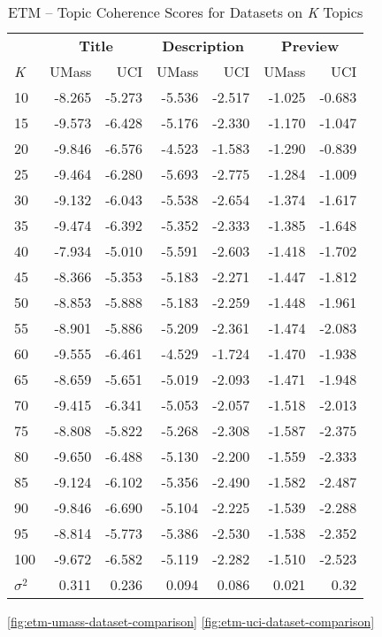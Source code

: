 \documentclass[letterpaper,12pt]{article}
\begin{document}
\begin{table}
	\caption{\label{tab:etm_data_comp} ETM -- Topic Coherence Scores for Datasets on \emph{K} Topics}
	\begin{center}
		\begin{tabular}{| l | rr | rr | rr |}
			\hline
			{} & \multicolumn{2}{c|}{\textbf{Title}} & \multicolumn{2}{c|}{\textbf{Description}} & \multicolumn{2}{c|}{\textbf{Preview}} \\
			\emph{K} &       UMass &    UCI &  UMass &    UCI &   UMass &    UCI \\
			\hline
			10  & -8.265 & -5.273 &      -5.536 & -2.517 &  -1.025 & -0.683 \\
			15  & -9.573 & -6.428 &      -5.176 & -2.330 &  -1.170 & -1.047 \\
			20  & -9.846 & -6.576 &      -4.523 & -1.583 &  -1.290 & -0.839 \\
			25  & -9.464 & -6.280 &      -5.693 & -2.775 &  -1.284 & -1.009 \\
			30  & -9.132 & -6.043 &      -5.538 & -2.654 &  -1.374 & -1.617 \\
			35  & -9.474 & -6.392 &      -5.352 & -2.333 &  -1.385 & -1.648 \\
			40  & -7.934 & -5.010 &      -5.591 & -2.603 &  -1.418 & -1.702 \\
			45  & -8.366 & -5.353 &      -5.183 & -2.271 &  -1.447 & -1.812 \\
			50  & -8.853 & -5.888 &      -5.183 & -2.259 &  -1.448 & -1.961 \\
			55  & -8.901 & -5.886 &      -5.209 & -2.361 &  -1.474 & -2.083 \\
			60  & -9.555 & -6.461 &      -4.529 & -1.724 &  -1.470 & -1.938 \\
			65  & -8.659 & -5.651 &      -5.019 & -2.093 &  -1.471 & -1.948 \\
			70  & -9.415 & -6.341 &      -5.053 & -2.057 &  -1.518 & -2.013 \\
			75  & -8.808 & -5.822 &      -5.268 & -2.308 &  -1.587 & -2.375 \\
			80  & -9.650 & -6.488 &      -5.130 & -2.200 &  -1.559 & -2.333 \\
			85  & -9.124 & -6.102 &      -5.356 & -2.490 &  -1.582 & -2.487 \\
			90  & -9.846 & -6.690 &      -5.104 & -2.225 &  -1.539 & -2.288 \\
			95  & -8.814 & -5.773 &      -5.386 & -2.530 &  -1.538 & -2.352 \\
			100 & -9.672 & -6.582 &      -5.119 & -2.282 &  -1.510 & -2.523 \\
			\hline
			$\sigma^2$ & 0.311 & 0.236 & 0.094 & 0.086 & 0.021 & 0.32 \\
			\hline
			\end{tabular}
	\end{center}
\end{table}
\ref{fig:etm-umass-dataset-comparison}
\ref{fig:etm-uci-dataset-comparison}
\end{document}
